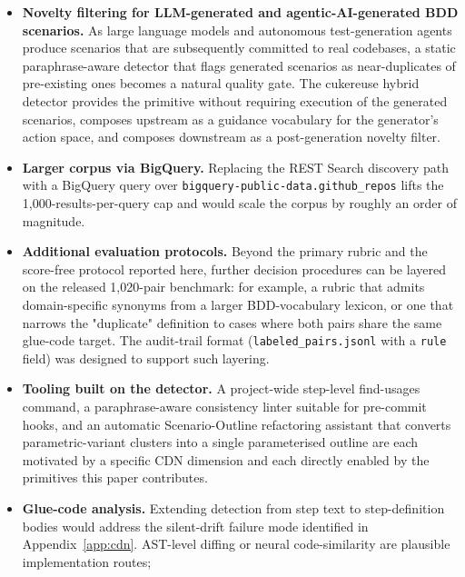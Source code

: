 \documentclass[11pt,a4paper]{article}
\begin{document}
\begin{itemize}[leftmargin=2em]
  \item \textbf{Novelty filtering for LLM-generated and
        agentic-AI-generated BDD scenarios.} As large language
        models and autonomous test-generation agents
        \citep{mughal2025rlagent} produce scenarios that are
        subsequently committed to real codebases, a static
        paraphrase-aware detector that flags generated scenarios as
        near-duplicates of pre-existing ones becomes a natural
        quality gate. The cukereuse hybrid detector provides the
        primitive without requiring execution of the generated
        scenarios, composes upstream as a guidance vocabulary for
        the generator's action space, and composes downstream as a
        post-generation novelty filter.
  \item \textbf{Larger corpus via BigQuery.} Replacing the REST
        Search discovery path with a BigQuery query over
        \texttt{bigquery-public-data.github\_repos} lifts the
        1{,}000-results-per-query cap and would scale the corpus
        by roughly an order of magnitude.
  \item \textbf{Additional evaluation protocols.} Beyond the
        primary rubric and the score-free protocol reported here,
        further decision procedures can be layered on the released
        1{,}020-pair benchmark: for example, a rubric that admits
        domain-specific synonyms from a larger BDD-vocabulary
        lexicon, or one that narrows the "duplicate" definition
        to cases where both pairs share the same glue-code target.
        The audit-trail format (\texttt{labeled\_pairs.jsonl} with
        a \texttt{rule} field) was designed to support such
        layering.
  \item \textbf{Tooling built on the detector.} A project-wide
        step-level find-usages command, a paraphrase-aware
        consistency linter suitable for pre-commit hooks, and
        an automatic Scenario-Outline refactoring assistant
        that converts parametric-variant clusters into a single
        parameterised outline are each motivated by a specific
        CDN dimension and each directly enabled by the
        primitives this paper contributes.
  \item \textbf{Glue-code analysis.} Extending detection from
        step text to step-definition bodies would address the
        silent-drift failure mode identified in
        Appendix~\ref{app:cdn}. AST-level diffing or neural
        code-similarity are plausible implementation routes;

\end{itemize}
\end{document}
